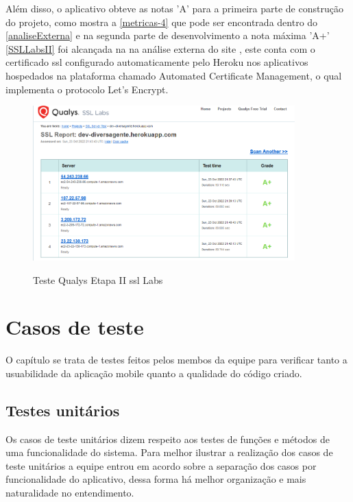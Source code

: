 Além disso, o aplicativo obteve as notas 'A' para a primeira parte de construção do projeto, como mostra a \autoref{metricas-4} que pode ser encontrada dentro do \autoref{analiseExterna} e na segunda parte de desenvolvimento a nota máxima 'A+' \autoref{SSLLabsII} foi alcançada na   na análise externa do site , este conta com o certificado \ac{ssl} configurado automaticamente pelo Heroku nos aplicativos hospedados na plataforma chamado Automated Certificate Management, o qual implementa o protocolo Let’s Encrypt.

\begin{figure}[h]
	\centering
	\caption{\label{fig_arq_virado}Teste Qualys Etapa II \ac{ssl} Labs}
	\includegraphics[width=0.90\textwidth]{anexos/SSLlabsII.png}
	\label{SSLLabsII}
\end{figure}

\pagebreak

\section{Casos de teste}

O capítulo se trata de testes feitos pelos membos da equipe para verificar tanto a usuabilidade da aplicação mobile quanto a qualidade do código criado. 


\subsection{Testes unitários}



Os casos de teste unitários dizem respeito aos testes de funções e métodos de uma funcionalidade do sistema. Para melhor ilustrar a realização dos casos de teste unitários a equipe entrou em acordo sobre a separação dos casos por funcionalidade do aplicativo, dessa forma há melhor organização e mais naturalidade no entendimento.

